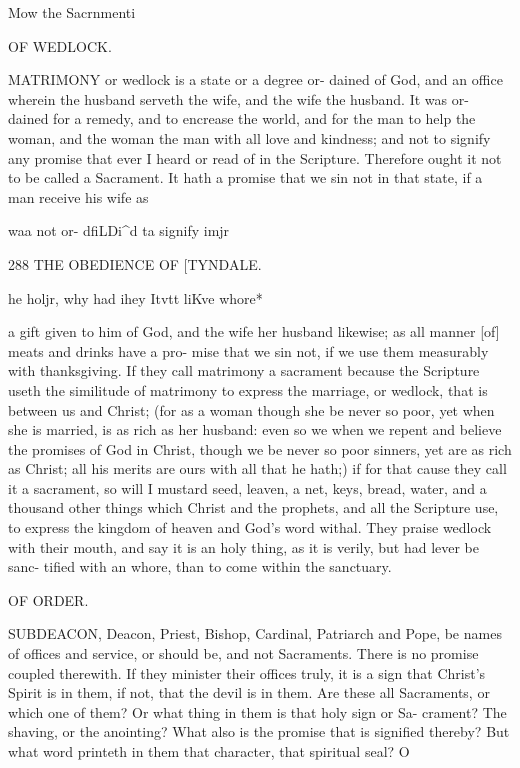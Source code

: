 \documentclass{custom}
\begin{document}
{{Mow the 
Sacrnmenti 


OF WEDLOCK. 

MATRIMONY or wedlock is a state or a degree or- 
dained of God, and an office wherein the husband 
serveth the wife, and the wife the husband. It was or- 
dained for a remedy, and to encrease the world, and for 
the man to help the woman, and the woman the man with 
all love and kindness; and not to signify any promise that 
ever I heard or read of in the Scripture. Therefore 
ought it not to be called a Sacrament. It hath a promise 
that we sin not in that state, if a man receive his wife as 

waa not or- 
dfiLDi^d ta 
signify imjr 


288
THE OBEDIENCE OF
[TYNDALE.

he holjr, 
why had 
ihey Itvtt 
liKve 
whore* 

a gift given to him of God, and the wife her husband 
likewise; as all manner [of] meats and drinks have a pro- 
mise that we sin not, if we use them measurably with 
thanksgiving. If they call matrimony a sacrament because 
the Scripture useth the similitude of matrimony to express 
the marriage, or wedlock, that is between us and Christ; 
(for as a woman though she be never so poor, yet when 
she is married, is as rich as her husband: even so we when 
we repent and believe the promises of God in Christ, 
though we be never so poor sinners, yet are as rich as 
Christ; all his merits are ours with all that he hath;) if 
for that cause they call it a sacrament, so will I mustard 
seed, leaven, a net, keys, bread, water, and a thousand 
other things which Christ and the prophets, and all the 
Scripture use, to express the kingdom of heaven and God's 
word withal. They praise wedlock with their mouth, and 
say it is an holy thing, as it is verily, but had lever be sanc- 
tified with an whore, than to come within the sanctuary. 


OF ORDER. 

SUBDEACON, Deacon, Priest, Bishop, Cardinal, 
Patriarch and Pope, be names of offices and service, or 
should be, and not Sacraments. There is no promise 
coupled therewith. If they minister their offices truly, it 
is a sign that Christ's Spirit is in them, if not, that the 
devil is in them. Are these all Sacraments, or which one 
of them? Or what thing in them is that holy sign or Sa- 
crament? The shaving, or the anointing? What also is 
the promise that is signified thereby? But what word 
printeth in them that character, that spiritual seal? O 


}}
\end{document}
